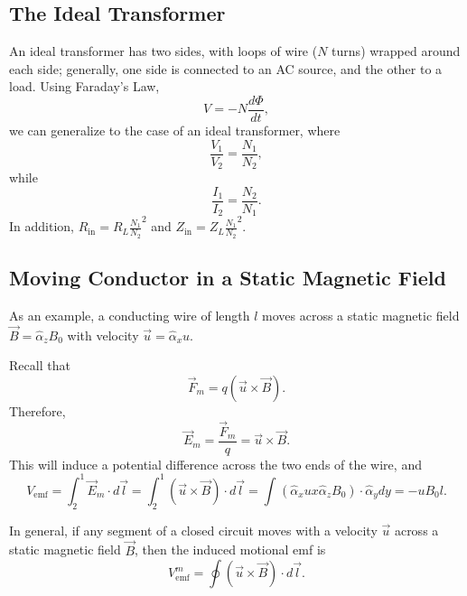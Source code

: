 \documentclass{article}
\begin{document}
\subsection{The Ideal Transformer}
An ideal transformer has two sides, with loops of wire (\(N\) turns) wrapped around each side; generally, one side is connected to an AC source, and the other to a load. Using Faraday's Law, 
\[
  V = -N \frac{d\Phi}{dt}, 
\]
we can generalize to the case of an ideal transformer, where
\[
	\frac{V_1}{V_2} = \frac{N_1}{N_2},
\]
while 
\[
  \frac{I_1}{I_2} = \frac{N_2}{N_1}.
\]
In addition,
\(R_{\mathrm{in}} = R_L \frac{N_1}{N_2}^2\) and \(Z_{\mathrm{in}} = Z_L \frac{N_1}{N_2}^2\).
  
\subsection{Moving Conductor in a Static Magnetic Field}
As an example, a conducting wire of length \(l\) moves across a static magnetic field \(\vec{B} = \hat{\alpha}_zB_0\) with velocity \(\vec{u}=\hat{\alpha}_x u\).

Recall that 
\[
  \vec{F}_m = q(\vec{u} \times \vec{B}).
\]
Therefore, 
\[
  \vec{E}_m = \frac{\vec{F}_m}{q} = \vec{u} \times \vec{B}.
\] 
This will induce a potential difference across the two ends of the wire, and 
\[
	V_{\mathrm{emf}} = \int_{2}^{1}\vec{E}_m \cdot d \vec{l} = \int_{2}^{1} (\vec{u} \times \vec{B}) \cdot d \vec{l} = \int_{}^{} (\hat{\alpha}_x u x \hat{\alpha}_z B_0) \cdot \hat{\alpha}_y dy = -u B_0 l.
\]

In general, if any segment of a closed circuit moves with a velocity \(\vec{u}\) across a static magnetic field \(\vec{B}\), then the induced motional emf is 
\[
	V_{\mathrm{emf}}^m = \oint (\vec{u} \times \vec{B}) \cdot d \vec{l}.
\]
\end{document}
